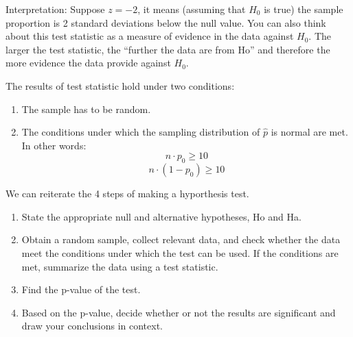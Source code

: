 \documentclass[10pt, a4paper]{article}
\begin{document}
Interpretation: Suppose $z=-2$, it means (assuming that $H_0$ is true) the sample proportion is 2 standard deviations below the null value. 
You can also think about this test statistic as a measure of evidence in the data against $H_0$. The larger the test statistic, the ``further the data are from Ho'' and therefore the more evidence the data provide against $H_0$.\par
The results of test statistic hold under two conditions:
\begin{enumerate}
\item The sample has to be random.
\item The conditions under which the sampling distribution of $\hat{p}$ is normal are met. In other words:
\[
n\cdot p_0 \geq 10
\]
\[
n\cdot (1-p_0) \geq 10
\]
\end{enumerate}
We can reiterate the 4 steps of making a hyporthesis test.
\begin{enumerate}
\item State the appropriate null and alternative hypotheses, Ho and Ha.
\item Obtain a random sample, collect relevant data, and check whether the data meet the conditions under which the test can be used. If the conditions are met, summarize the data using a test statistic.
\item Find the p-value of the test.
\item Based on the p-value, decide whether or not the results are significant and draw your conclusions in context.
\end{enumerate}
\end{document}
